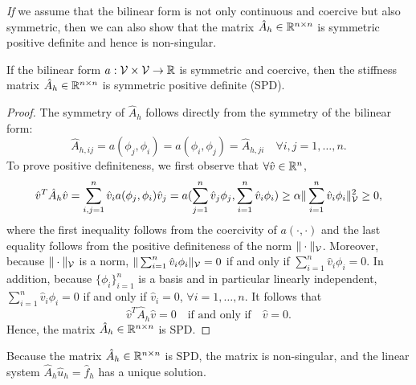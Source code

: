 \emph{If} we assume that the bilinear form is not only continuous and coercive but also symmetric, then we can also show that the matrix $\hat A_h \in \mathbb{R}^{n \times n}$ is symmetric positive definite and hence is non-singular. 
\begin{proposition}
  \label{prop:fe_form_Ah_spd}
  If the bilinear form $a: \mathcal{V} \times \mathcal{V} \to \mathbb{R}$ is symmetric and coercive, then the stiffness matrix $\hat A_h \in \mathbb{R}^{n \times n}$ is symmetric positive definite (SPD).
  \begin{proof}
    The symmetry of $\hat A_h$ follows directly from the symmetry of the bilinear form:
  \begin{equation*}
    \hat A_{h,ij} = a(\phi_j,\phi_i) = a(\phi_i,\phi_j) = \hat A_{h,ji} \quad  \forall i,j = 1, \dots, n.
  \end{equation*}
  To prove positive definiteness, we first observe that $\forall \hat v \in \mathbb{R}^n$, 
\begin{equation*}
  \hat v^T \hat A_{h} \hat v
  =
  \sum_{i,j = 1}^n \hat v_i a(\phi_j, \phi_i) \hat v_j 
  = a(\sum_{j=1}^n \hat v_j \phi_j, \sum_{i=1}^n \hat v_i \phi_i)
  \geq \alpha \| \sum_{i=1}^n \hat v_i \phi_i \|^2_{\mathcal{V}} \geq 0,
\end{equation*}
where the first inequality follows from the coercivity of $a(\cdot,\cdot)$ and the last equality follows from the positive definiteness of the norm $\| \cdot \|_{\mathcal{V}}$. Moreover, because $\| \cdot \|_{\mathcal{V}}$ is a norm, $\| \sum_{i=1}^n \hat v_i \phi_i \|_{\mathcal{V}} = 0$ if and only if $\sum_{i=1}^n \hat v_i \phi_i = 0$.  In addition, because $\{\phi_i\}_{i=1}^n$ is a basis and in particular linearly independent, $\sum_{i=1}^n \hat v_i \phi_i = 0$ if and only if $\hat v_i = 0$, $\forall i = 1,\dots,n$. It follows that
\begin{equation*}
  \hat v^T \hat A_h \hat v = 0 \quad \text{if and only if} \quad \hat v = 0.
\end{equation*}
Hence, the matrix $\hat A_h \in \mathbb{R}^{n \times n}$ is SPD.
  \end{proof}
\end{proposition}
\begin{remark}
  Because the matrix $\hat A_h \in \mathbb{R}^{n \times n}$ is SPD, the matrix is non-singular, and the linear system $\hat A_h \hat u_h = \hat f_h$ has a unique solution.
\end{remark}

